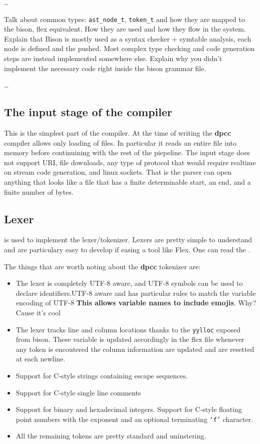 \documentclass[a4paper]{article}
\newcommand{\urlref}[3][blue]{\href{#2}{\color{#1}{#3}}}%
\begin{document}
\dots

Talk about common types: \texttt{ast\_node\_t}, \texttt{token\_t} and how they are mapped to the bison, flex equivalent.
How they are used and how they flow in the system. Explain that Bison is mostly used as a syntax
checker + symtable analysis, each node is defined and the pushed. Most complex type checking and
code generation steps are instead implemented somewhere else. Explain why you didn't implement
the necessary code right inside the bison grammar file.

\dots

\subsection{The input stage of the compiler}
This is the simplest part of the compiler. At the time of writing the \textbf{dpcc} compiler
allows only loading of files. In particular it reads an entire file into memory before continuining
with the rest of the piepeline. The input stage does not support URI, file downloads, any type of protocol
that would require realtime on stream code generation, and linux sockets. That is the
parser can open anything that looks like a file that has a finite determinable start, an end,
and a finite number of bytes.

\subsection{Lexer}

\urlref{https://github.com/westes/flex/}{Flex} is used to implement the lexer/tokenizer. Lexers are pretty simple to understand and
are particulary easy to develop if easing a tool like Flex. One can read the \urlref{https://www.cs.virginia.edu/~cr4bd/flex-manual/}{Flex Manual}.

The things that are worth noting about the \textbf{dpcc} tokenizer are:

\begin{itemize}
\item The lexer is completely UTF-8 aware, and UTF-8 symbols can be used to declare identifiers.UTF-8 aware and has particular
rules to match the variable encoding of UTF-8 \textbf{This allows variable names to include emojis}. Why? Cause it's cool \smiley
\item The lexer tracks line and column locations thanks to the \texttt{yylloc} exposed from bison. These
    variable is updated accordingly in the flex file whenever any token is encoutered the column information
    are updated and are resetted at each newline.
\item Support for C-style strings containing escape sequences.
\item Support for C-style single line comments
\item Support for binary and hexadecimal integers. Support for C-style floating point numbers with the exponent and an optional terminating \texttt{`f'} character.
\item All the remaining tokens are pretty standard and uninstering.
\end{itemize}
\end{document}
